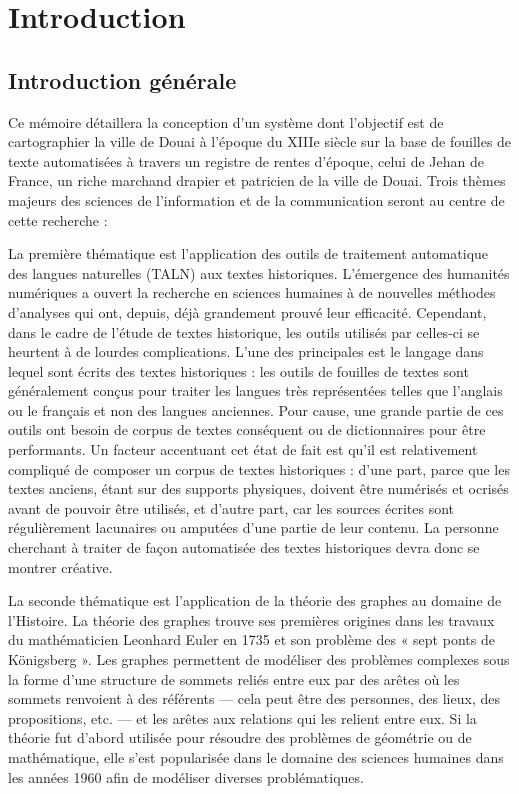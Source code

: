 \chapter{Introduction}
\section{Introduction générale}
 Ce mémoire détaillera la conception d’un système dont l’objectif est de cartographier la ville de Douai à l’époque du XIIIe siècle sur la base de fouilles de texte automatisées à travers un registre de rentes d'époque, celui de Jehan de France, un riche marchand drapier et patricien de la ville de Douai. Trois thèmes majeurs des sciences de l'information et de la communication seront au centre de cette recherche :
 
 La première thématique est l’application des outils de traitement automatique des langues naturelles (TALN) aux textes historiques. L’émergence des humanités numériques a ouvert la recherche en sciences humaines à de nouvelles méthodes d’analyses qui ont, depuis, déjà grandement prouvé leur efficacité. Cependant, dans le cadre de l’étude de textes historique, les outils utilisés par celles-ci se heurtent à de lourdes complications. L’une des principales est le langage dans lequel sont écrits des textes historiques : les outils de fouilles de textes sont généralement conçus pour traiter les langues très représentées telles que l’anglais ou le français et non des langues anciennes. Pour cause, une grande partie de ces outils ont besoin de corpus de textes conséquent ou de dictionnaires pour être performants. Un facteur accentuant cet état de fait est qu’il est relativement compliqué de composer un corpus de textes historiques : d’une part, parce que les textes anciens, étant sur des supports physiques, doivent être numérisés et ocrisés avant de pouvoir être utilisés, et d’autre part, car les sources écrites sont régulièrement lacunaires ou amputées d’une partie de leur contenu. La personne cherchant à traiter de façon automatisée des textes historiques devra donc se montrer créative.
 
La seconde thématique est l’application de la théorie des graphes au domaine de l’Histoire. La théorie des graphes trouve ses premières origines dans les travaux du mathématicien Leonhard Euler en 1735 et son problème des « sept ponts de Königsberg ». Les graphes permettent de modéliser des problèmes complexes sous la forme d’une structure de sommets reliés entre eux par des arêtes où les sommets renvoient à des référents — cela peut être des personnes, des lieux, des propositions, etc. — et les arêtes aux relations qui les relient entre eux. Si la théorie fut d’abord utilisée pour résoudre des problèmes de géométrie ou de mathématique, elle s’est popularisée dans le domaine des sciences humaines dans les années 1960 afin de modéliser diverses problématiques.

